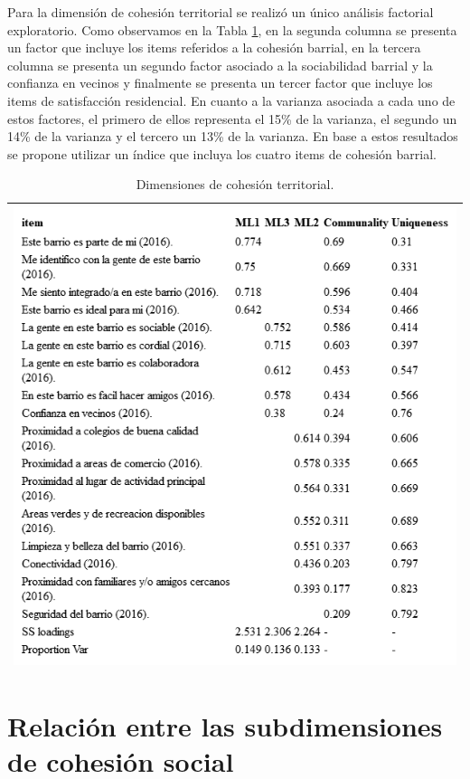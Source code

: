 \documentclass[
  12pt,
]{book}
\begin{document}
Para la dimensión de cohesión territorial se realizó un único análisis factorial exploratorio. Como observamos en la Tabla \ref{tab:cohesion-territorial-fa}, en la segunda columna se presenta un factor que incluye los items referidos a la cohesión barrial, en la tercera columna se presenta un segundo factor asociado a la sociabilidad barrial y la confianza en vecinos y finalmente se presenta un tercer factor que incluye los items de satisfacción residencial. En cuanto a la varianza asociada a cada uno de estos factores, el primero de ellos representa el 15\% de la varianza, el segundo un 14\% de la varianza y el tercero un 13\% de la varianza. En base a estos resultados se propone utilizar un índice que incluya los cuatro items de cohesión barrial.

\begin{longtable}[]{@{}l@{}}
\caption{\label{tab:cohesion-territorial-fa}Dimensiones de cohesión territorial.}\tabularnewline
\toprule
\endhead
\includegraphics[width=8.33333in,height=\textheight]{output/tables/cohesion_territorial_fa.png} \\
\bottomrule
\end{longtable}

\hypertarget{relaciuxf3n-entre-las-subdimensiones-de-cohesiuxf3n-social}{%
\section{Relación entre las subdimensiones de cohesión social}\label{relaciuxf3n-entre-las-subdimensiones-de-cohesiuxf3n-social}}
\end{document}
